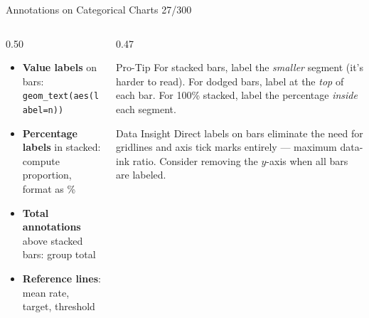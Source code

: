 \documentclass[10pt]{beamer}
\newcommand{\smark}[1]{\hfill{\scriptsize\color{codegray}#1}}
\begin{document}
\begin{frame}{Annotations on Categorical Charts}
\smark{27/300}
\begin{columns}[T]
\begin{column}{0.50\textwidth}
\begin{itemize}
    \item \textbf{Value labels} on bars: \texttt{geom\_text(aes(label=n))}
    \item \textbf{Percentage labels} in stacked: compute proportion, format as \%
    \item \textbf{Total annotations} above stacked bars: group total
    \item \textbf{Reference lines}: mean rate, target, threshold
\end{itemize}
\end{column}
\begin{column}{0.47\textwidth}
\begin{alertblock}{Pro-Tip}
    \scriptsize For stacked bars, label the \emph{smaller} segment (it's harder to read). For dodged bars, label at the \emph{top} of each bar. For 100\% stacked, label the percentage \emph{inside} each segment.
\end{alertblock}
\vspace{0.1cm}
\begin{exampleblock}{Data Insight}
    \scriptsize Direct labels on bars eliminate the need for gridlines and axis tick marks entirely --- maximum data-ink ratio. Consider removing the $y$-axis when all bars are labeled.
\end{exampleblock}
\end{column}
\end{columns}
\end{frame}
\end{document}
